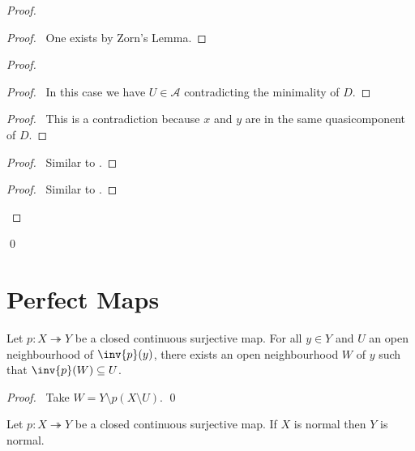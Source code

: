 \begin{proof}
\begin{proof}
  \pf\ One exists by Zorn's Lemma.
\end{proof}
\begin{proof}
  \begin{proof}
    \pf\ In this case we have $U \in \mathcal{A}$ contradicting the minimality of $D$.
  \end{proof}
  \begin{proof}
    \pf\ This is a contradiction because $x$ and $y$ are in the same quasicomponent of $D$.
  \end{proof}
  \begin{proof}
    \pf\ Similar to .
  \end{proof}
  \begin{proof}
    \pf\ Similar to .
  \end{proof}
\end{proof}
\qed
\end{proof}

\section{Perfect Maps}

  \begin{prop}
    \label{prop:topology:perfect:neighbourhood}
 Let $p : X \twoheadrightarrow Y$ be a closed continuous surjective map. For
 all $y \in Y$ and $U$ an open neighbourhood of $\inv{p}(y)$, there exists an
 open neighbourhood $W$ of $y$ such that $\inv{p}(W) \subseteq U$.
\end{prop}

\begin{proof}
 \pf\ Take $W = Y \setminus p(X \setminus U)$. \qed
\end{proof}

    \begin{prop}[AC]
 Let $p : X \twoheadrightarrow Y$ be a closed continuous surjective map. If
$X$ is normal then $Y$ is normal.
\end{prop}

